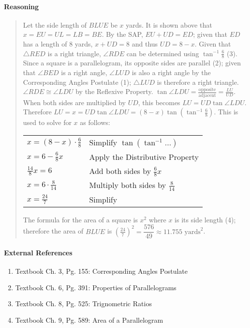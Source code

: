 \documentclass[letterpaper,12pt,twoside]{report}
\begin{document}
	\paragraph{Reasoning}
	\begin{quotation}
		
		Let the side length of $BLUE$ be $x$ yards. It is shown above that $x=EU=UL=LB=BE$. By the SAP, $EU+UD=ED$; given that $ED$ has a length of 8 yards, $x+UD=8$ and thus $UD=8-x$. Given that $\triangle RED$ is a right triangle, $\angle RDE$ can be determined using $\tan^{-1} \frac{6}{8}$ (3). Since a square is a parallelogram, its opposite sides are parallel (2); given that $\angle BED$ is a right angle, $\angle LUD$ is also a right angle by the Corresponding Angles Postulate (1); $\triangle LUD$ is therefore a right triangle. $\angle RDE \cong \angle LDU$ by the Reflexive Property. $\tan \angle LDU = \frac{\text{opposite}}{\text{adjacent}} = \frac{LU}{UD}$. When both sides are multiplied by $UD$, this becomes $LU=UD \tan \angle LDU$. Therefore $LU=x=UD \tan \angle LDU=(8-x)\tan (\tan^{-1} \frac{6}{8})$. This is used to solve for $x$ as follows:
		
		\begin{center}
			\begin{tabular}{l | l}
				$x=(8-x) \cdot \frac{6}{8}$ & Simplify $\tan(\tan^{-1} ...)$ \\
				$x=6-\frac{6}{8}x$ & Apply the Distributive Property \\
				$\frac{14}{8}x=6$ & Add both sides by $\frac{6}{8}x$ \\
				$x=6 \cdot \frac{8}{14}$ & Multiply both sides by $\frac{8}{14}$ \\
				$x=\frac{24}{7}$ & Simplify
			\end{tabular}
		\end{center}
		
		The formula for the area of a square is $x^2$ where $x$ is its side length (4); therefore the area of $BLUE$ is $(\frac{24}{7})^2=\boxed{\dfrac{576}{49} \approx 11.755 \text{  yards}^2}$.
	\end{quotation}
	
	\paragraph{External References}
	
	\begin{enumerate}
		\item Textbook Ch. 3, Pg. 155: Corresponding Angles Postulate
		\item Textbook Ch. 6, Pg. 391: Properties of Parallelograms
		\item Textbook Ch. 8, Pg. 525: Trignometric Ratios
		\item Textbook Ch. 9, Pg. 589: Area of a Parallelogram
	\end{enumerate}
	
\end{document}
